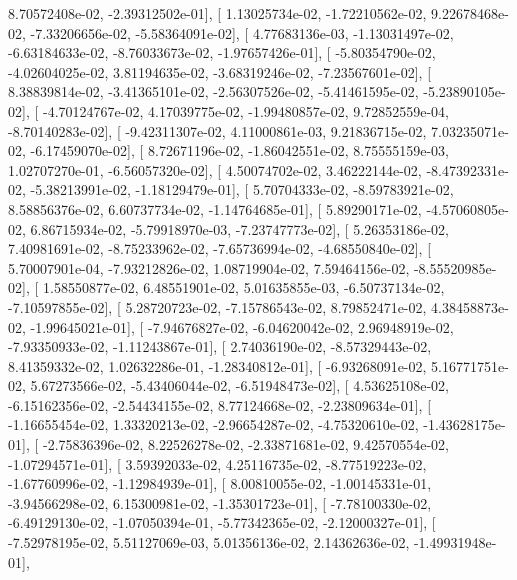 \documentclass{article}
\begin{document}
          8.70572408e-02,  -2.39312502e-01],
       [  1.13025734e-02,  -1.72210562e-02,   9.22678468e-02,
         -7.33206656e-02,  -5.58364091e-02],
       [  4.77683136e-03,  -1.13031497e-02,  -6.63184633e-02,
         -8.76033673e-02,  -1.97657426e-01],
       [ -5.80354790e-02,  -4.02604025e-02,   3.81194635e-02,
         -3.68319246e-02,  -7.23567601e-02],
       [  8.38839814e-02,  -3.41365101e-02,  -2.56307526e-02,
         -5.41461595e-02,  -5.23890105e-02],
       [ -4.70124767e-02,   4.17039775e-02,  -1.99480857e-02,
          9.72852559e-04,  -8.70140283e-02],
       [ -9.42311307e-02,   4.11000861e-03,   9.21836715e-02,
          7.03235071e-02,  -6.17459070e-02],
       [  8.72671196e-02,  -1.86042551e-02,   8.75555159e-03,
          1.02707270e-01,  -6.56057320e-02],
       [  4.50074702e-02,   3.46222144e-02,  -8.47392331e-02,
         -5.38213991e-02,  -1.18129479e-01],
       [  5.70704333e-02,  -8.59783921e-02,   8.58856376e-02,
          6.60737734e-02,  -1.14764685e-01],
       [  5.89290171e-02,  -4.57060805e-02,   6.86715934e-02,
         -5.79918970e-03,  -7.23747773e-02],
       [  5.26353186e-02,   7.40981691e-02,  -8.75233962e-02,
         -7.65736994e-02,  -4.68550840e-02],
       [  5.70007901e-04,  -7.93212826e-02,   1.08719904e-02,
          7.59464156e-02,  -8.55520985e-02],
       [  1.58550877e-02,   6.48551901e-02,   5.01635855e-03,
         -6.50737134e-02,  -7.10597855e-02],
       [  5.28720723e-02,  -7.15786543e-02,   8.79852471e-02,
          4.38458873e-02,  -1.99645021e-01],
       [ -7.94676827e-02,  -6.04620042e-02,   2.96948919e-02,
         -7.93350933e-02,  -1.11243867e-01],
       [  2.74036190e-02,  -8.57329443e-02,   8.41359332e-02,
          1.02632286e-01,  -1.28340812e-01],
       [ -6.93268091e-02,   5.16771751e-02,   5.67273566e-02,
         -5.43406044e-02,  -6.51948473e-02],
       [  4.53625108e-02,  -6.15162356e-02,  -2.54434155e-02,
          8.77124668e-02,  -2.23809634e-01],
       [ -1.16655454e-02,   1.33320213e-02,  -2.96654287e-02,
         -4.75320610e-02,  -1.43628175e-01],
       [ -2.75836396e-02,   8.22526278e-02,  -2.33871681e-02,
          9.42570554e-02,  -1.07294571e-01],
       [  3.59392033e-02,   4.25116735e-02,  -8.77519223e-02,
         -1.67760996e-02,  -1.12984939e-01],
       [  8.00810055e-02,  -1.00145331e-01,  -3.94566298e-02,
          6.15300981e-02,  -1.35301723e-01],
       [ -7.78100330e-02,  -6.49129130e-02,  -1.07050394e-01,
         -5.77342365e-02,  -2.12000327e-01],
       [ -7.52978195e-02,   5.51127069e-03,   5.01356136e-02,
          2.14362636e-02,  -1.49931948e-01],
\end{document}
